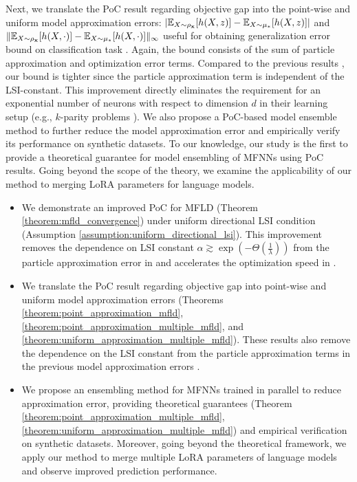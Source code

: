 Next, we translate the PoC result regarding objective gap into the point-wise and uniform model approximation errors: $|\mathbb{E}_{X\sim\rho_{\mathbf{x}}}[h(X,z)] - \mathbb{E}_{X\sim\mu_*}[h(X,z)]|$ and $\| \mathbb{E}_{X\sim\rho_{\mathbf{x}}}[h(X,\cdot)] - \mathbb{E}_{X\sim\mu_*}[h(X,\cdot)]\|_{\infty}$ useful for obtaining generalization error bound on classification task \cite{suzuki2023featurelearning,nitanda2024statistical}. Again, the bound consists of the sum of particle approximation and optimization error terms.
Compared to the previous results \cite{suzuki2023convergence,suzuki2023featurelearning}, our bound is tighter since the particle approximation term is independent of the LSI-constant. This improvement directly eliminates the requirement for an exponential number of neurons with respect to dimension $d$ in their learning setup (e.g., $k$-parity problems \cite{suzuki2023featurelearning}).
We also propose a PoC-based model ensemble method to further reduce the model approximation error and empirically verify its performance on synthetic datasets. To our knowledge, our study is the first to provide a theoretical guarantee for model ensembling of MFNNs using PoC results. Going beyond the scope of the theory, we examine the applicability of our method to merging LoRA parameters for language models.
\begin{itemize}
    \item We demonstrate an improved PoC for MFLD (Theorem \ref{theorem:mfld_convergence}) under uniform directional LSI condition (Assumption \ref{assumption:uniform_directional_lsi}). This improvement removes the dependence on LSI constant $\alpha \gtrsim \exp\left(-\Theta\left(\frac{1}{\lambda}\right)\right)$ from the particle approximation error in \citet{chen2022uniform,suzuki2023convergence} and accelerates the optimization speed in \citet{nitanda2024improved,chewi2024uniform}.
    \item We translate the PoC result regarding objective gap into point-wise and uniform model approximation errors (Theorems \ref{theorem:point_approximation_mfld}, \ref{theorem:point_approximation_multiple_mfld}, and \ref{theorem:uniform_approximation_multiple_mfld}). These results also remove the dependence on the LSI constant from the particle approximation terms in the previous model approximation errors \cite{suzuki2023convergence,suzuki2023featurelearning}.
    \item We propose an ensembling method for MFNNs trained in parallel to reduce approximation error, providing theoretical guarantees (Theorem \ref{theorem:point_approximation_multiple_mfld}, \ref{theorem:uniform_approximation_multiple_mfld}) and empirical verification on synthetic datasets. Moreover, going beyond the theoretical framework, we apply our method to merge multiple LoRA parameters of language models and observe improved prediction performance.
\end{itemize}


